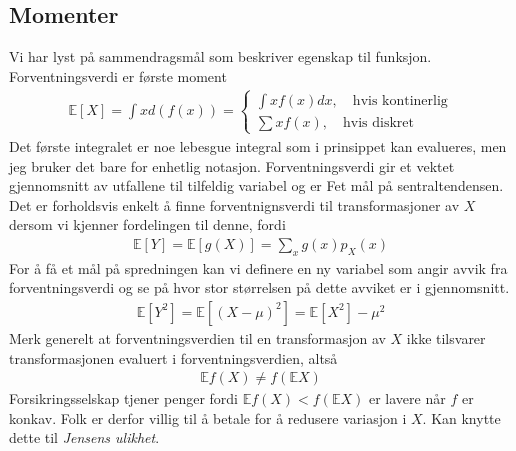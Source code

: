 \subsection{Momenter}
Vi har lyst på sammendragsmål som beskriver egenskap til funksjon. Forventningsverdi er første moment
\begin{align}
\mathbb{E}[X] = \int x d(f(x)) = 
\begin{cases} 
\int x f(x) dx ,\quad \text{hvis kontinerlig} \\
\sum x f(x),\quad \text{hvis diskret}
\end{cases}
\end{align}
Det første integralet er noe lebesgue integral som i prinsippet kan evalueres, men jeg bruker det bare for enhetlig notasjon. Forventningsverdi gir et vektet gjennomsnitt av utfallene til tilfeldig variabel og er Fet mål på sentraltendensen. Det er forholdsvis enkelt å finne forventnignsverdi til transformasjoner av $X$ dersom vi kjenner fordelingen til denne, fordi
\begin{align}
\mathbb{E}[Y]=\mathbb{E}[g(X)] = \sum_x g(x)p_X(x)
\end{align}
For å få et mål på spredningen kan vi definere en ny variabel som angir avvik fra forventningsverdi og se på hvor stor størrelsen på dette avviket er i gjennomsnitt.
\begin{align}
\mathbb{E}[Y^2]= \mathbb{E}[(X-\mu)^2] = \mathbb{E}[X^2]-\mu^2
\end{align}
Merk generelt at forventningsverdien til en transformasjon av $X$ ikke tilsvarer transformasjonen evaluert i forventningsverdien, altså
\begin{align}
\mathbb{E}f(X) \neq f(\mathbb{E}X)
\end{align}
Forsikringsselskap tjener penger fordi $\mathbb{E}f(X)<f(\mathbb{E}X)$ er lavere når $f$ er konkav. Folk er derfor villig til å betale for å redusere variasjon i $X$. Kan knytte dette til \textit{Jensens ulikhet}.
